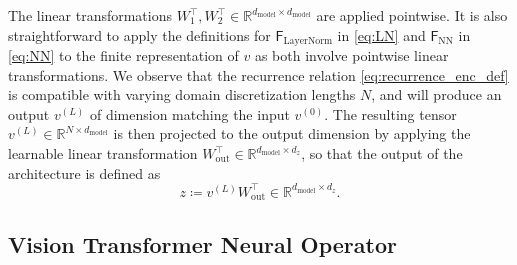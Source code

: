 \documentclass[twoside]{article}
\newcommand{\1}{\mathbbm{1}}
\newcommand{\R}{\mathbbm{R}}
\newcommand{\sF}{\mathsf{F}}
\providecommand{\mathbbm}{\mathbb} %
\begin{document}
The linear transformations $W_1^\top,W_2^\top\in\R^{d_{\textrm{model}}\times d_{\textrm{model}}}$ are applied pointwise. It is also straightforward to apply the definitions for $\sF_\textrm{LayerNorm}$ in \eqref{eq:LN} and $\sF_\textrm{NN}$ in \eqref{eq:NN} to the finite representation of $v$ as both involve pointwise linear transformations.
We observe that the recurrence relation \eqref{eq:recurrence_enc_def} is compatible with varying domain discretization lengths $N$, and will produce an output $v^{(L)}$ of dimension matching the input $v^{(0)}$. The resulting tensor $v^{(L)}\in \R^{N \times  d_{\textrm{model}}}$ is then projected to the output dimension by applying the learnable linear transformation $W_{\textrm{out}}^\top\in \R^{d_{\textrm{model}} \times d_z}$, so that the output of the architecture is defined as 
\[
z\coloneqq v^{(L)}W_{\textrm{out}}^\top \in \R^{d_{\textrm{model}} \times d_z}.
\]

\subsection{Vision Transformer Neural Operator}
\label{subsubsec:ViT_implementation}
\end{document}
